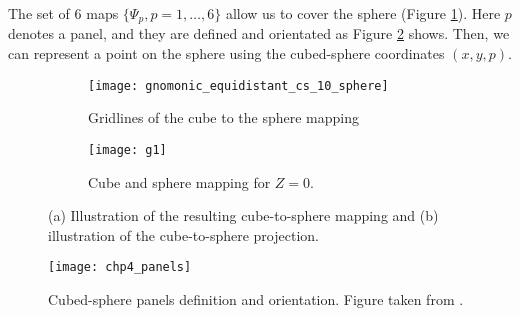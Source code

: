 The set of 6 maps $\{\Psi_{p}, p = 1, \ldots, 6\}$ allow us to cover the sphere (Figure \ref{chp-cs-equidistant}).
Here $p$ denotes a panel, and they are defined and orientated as Figure \ref{chp-cs-panels}
shows. Then, we can represent a point on the sphere using the cubed-sphere coordinates
$(x,y,p)$.
\begin{figure}[!htb]
	\centering
	\begin{subfigure}{0.42\textwidth}
		\texttt{[image: gnomonic\_equidistant\_cs\_10\_sphere]}
		\caption{Gridlines of the cube to the sphere mapping}
	\end{subfigure}
	\begin{subfigure}{0.42\textwidth}
		\centering
		\texttt{[image: g1]}
		\caption{Cube and sphere mapping for $Z=0$.}
	\end{subfigure}
	\caption{(a) Illustration of the resulting cube-to-sphere mapping and (b) illustration of the cube-to-sphere projection.\label{chp-cs-equidistant}}
\end{figure}
\newpage
\begin{figure}[!htb]
	\centering
	\texttt{[image: chp4\_panels]}
	\caption{Cubed-sphere panels definition and orientation.
    Figure taken from \citet{jung:2019}.\label{chp-cs-panels}}
\end{figure}

